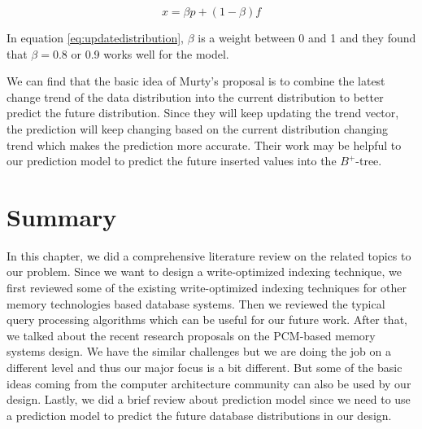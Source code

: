\begin{equation}\label{eq:updatedistribution}
    x=\beta p+(1-\beta)f
\end{equation}

In equation \ref{eq:updatedistribution}, $\beta$ is a weight between 0 and 1 and they found that $\beta=$0.8 or 0.9 works well for the model.

We can find that the basic idea of Murty's proposal is to combine the latest change trend of the data distribution into the
current distribution to better predict the future distribution. Since they will keep updating the trend vector, the prediction
will keep changing based on the current distribution changing trend which makes the prediction more accurate. Their work may be
helpful to our prediction model to predict the future inserted values into the $B^+$-tree.


\section{Summary}

In this chapter, we did a comprehensive literature review on the related topics to our problem. Since we want to design a write-optimized 
indexing technique, we first reviewed some of the existing write-optimized indexing techniques for other memory technologies based database systems. 
Then we reviewed the typical query processing algorithms which can be useful for our future work. After that, we talked about the recent 
research proposals on the PCM-based memory systems design. We have the similar challenges but we are doing the job on a different level and thus our
major focus is a bit different. But some of the basic ideas coming from the computer architecture community can also be used by our design. Lastly, 
we did a brief review about prediction model since we need to use a prediction model to predict the future database distributions in our design. 

\newpage
